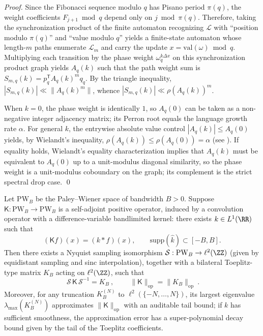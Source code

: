 \begin{proof}
Since the Fibonacci sequence modulo \(q\) has Pisano period \(\pi(q)\), the weight coefficients \(F_{j+1}\bmod q\) depend only on \(j\bmod \pi(q)\).
Therefore, taking the synchronization product of the finite automaton recognizing \(\mathcal{L}\) with ``position modulo \(\pi(q)\)'' and ``value modulo \(q\)'' yields a finite-state automaton whose length-\(m\) paths enumerate \(\mathcal{L}_m\) and carry the update \(x=\mathrm{val}(\omega)\bmod q\).
Multiplying each transition by the phase weight \(\omega_q^{k\Delta x}\) on this synchronization product graph yields \(A_q(k)\) such that the path weight sum is \(S_{m,q}(k)=p_q^{\mathsf T}A_q(k)^m q_q\).
By the triangle inequality, \(|S_{m,q}(k)|\ll \|A_q(k)^m\|\), whence \(|S_{m,q}(k)|\ll \rho(A_q(k))^m\).

When \(k=0\), the phase weight is identically \(1\), so \(A_q(0)\) can be taken as a non-negative integer adjacency matrix; its Perron root equals the language growth rate \(\alpha\).
For general \(k\), the entrywise absolute value control \(|A_q(k)|\le A_q(0)\) yields, by Wielandt's inequality, \(\rho(A_q(k))\le \rho(A_q(0))=\alpha\) (see \cite{Wielandt1950UnzerlegbareNichtnegative}).
If equality holds, Wielandt's equality characterization implies that \(A_q(k)\) must be equivalent to \(A_q(0)\) up to a unit-modulus diagonal similarity, so the phase weight is a unit-modulus coboundary on the graph; its complement is the strict spectral drop case. \qed
\end{proof}

\begin{theorem}\label{thm:gm-pw-bandlimited-sampling-toeplitz}
Let \(\mathrm{PW}_B\) be the Paley--Wiener space of bandwidth \(B>0\).
Suppose \(\mathsf{K}:\mathrm{PW}_B\to \mathrm{PW}_B\) is a self-adjoint positive operator, induced by a convolution operator with a difference-variable bandlimited kernel: there exists \(k\in L^1(\RR)\) such that
\[
(\mathsf{K}f)(x)=(k*f)(x),\qquad \mathrm{supp}(\widehat{k})\subset[-B,B].
\]
Then there exists a Nyquist sampling isomorphism \(\mathcal{S}:\mathrm{PW}_B\to \ell^2(\ZZ)\) (given by equidistant sampling and sinc interpolation), together with a bilateral Toeplitz-type matrix \(K_B\) acting on \(\ell^2(\ZZ)\), such that
\[
\boxed{\ \mathcal{S}\,\mathsf{K}\,\mathcal{S}^{-1}=K_B\ },
\qquad
\boxed{\ \|\mathsf{K}\|_{\mathrm{op}}=\|K_B\|_{\mathrm{op}}\ }.
\]
Moreover, for any truncation \(K_B^{(N)}\) to \(\ell^2(\{-N,\dots,N\})\), its largest eigenvalue \(\lambda_{\max}(K_B^{(N)})\) approximates \(\|\mathsf{K}\|_{\mathrm{op}}\) with an auditable tail bound; if \(k\) has sufficient smoothness, the approximation error has a super-polynomial decay bound given by the tail of the Toeplitz coefficients.
\end{theorem}

